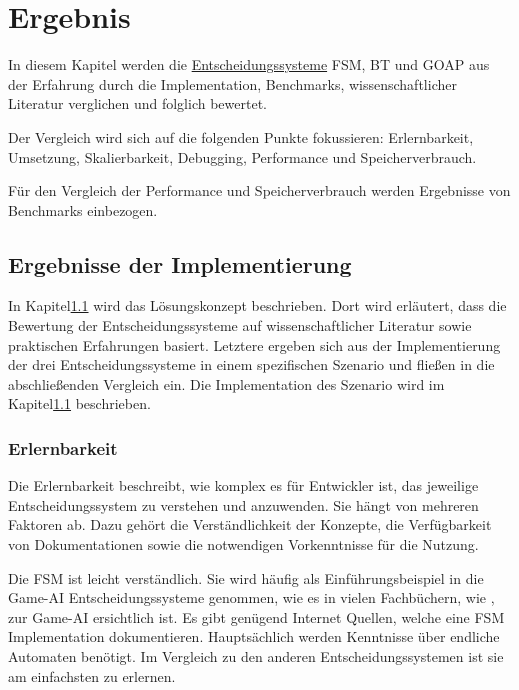 \chapter{Ergebnis}
\label{chap:ergebnis}

In diesem Kapitel werden die \hyperref[chap:entscheidungssysteme]{Entscheidungssysteme} FSM, BT und GOAP aus der Erfahrung durch die Implementation, Benchmarks, wissenschaftlicher Literatur verglichen und folglich bewertet.

Der Vergleich wird sich auf die folgenden Punkte fokussieren: Erlernbarkeit, Umsetzung, Skalierbarkeit, Debugging, Performance und Speicherverbrauch. 

F\"{u}r den Vergleich der Performance und Speicherverbrauch werden Ergebnisse von Benchmarks einbezogen.

\section{Ergebnisse der Implementierung}

In Kapitel\ref{} wird das L\"{o}sungskonzept beschrieben. Dort wird erl\"{a}utert, dass die Bewertung der Entscheidungssysteme auf wissenschaftlicher Literatur sowie praktischen Erfahrungen basiert. Letztere ergeben sich aus der Implementierung der drei Entscheidungssysteme in einem spezifischen Szenario und flie\ss{}en in die abschlie\ss{}enden Vergleich ein. Die Implementation des Szenario wird im Kapitel\ref{} beschrieben.


\subsection{Erlernbarkeit}
\label{chap:erlernbarkeit}

Die Erlernbarkeit beschreibt, wie komplex es f\"{u}r Entwickler ist, das jeweilige Entscheidungssystem zu verstehen und anzuwenden. Sie h\"{a}ngt von mehreren Faktoren ab. Dazu geh\"{o}rt die Verst\"{a}ndlichkeit der Konzepte, die Verf\"{u}gbarkeit von Dokumentationen sowie die notwendigen Vorkenntnisse f\"{u}r die Nutzung.

Die FSM ist leicht verst\"{a}ndlich. Sie wird h\"{a}ufig als Einf\"{u}hrungsbeispiel in die Game-AI Entscheidungssysteme genommen, wie es in vielen Fachb\"{u}chern, wie \autocite{}, zur Game-AI ersichtlich ist. Es gibt gen\"{u}gend Internet Quellen, welche eine FSM Implementation dokumentieren. Haupts\"{a}chlich werden Kenntnisse \"{u}ber endliche Automaten ben\"{o}tigt. Im Vergleich zu den anderen Entscheidungssystemen ist sie am einfachsten zu erlernen.


